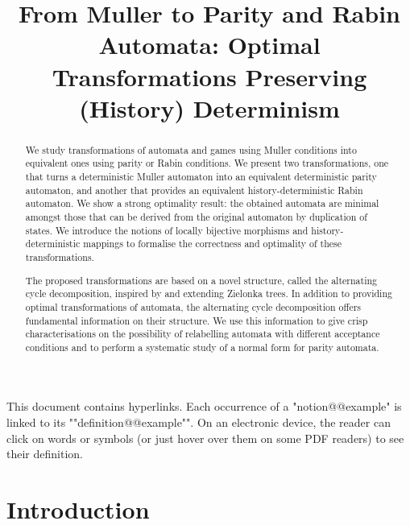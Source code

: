 \documentclass{theoretics}
\title{From Muller to Parity and Rabin Automata: Optimal Transformations Preserving (History) Determinism}
\begin{document}
	\maketitle
	\begin{abstract}
	We study transformations of automata and games using Muller conditions into equivalent ones using parity or Rabin conditions.
	We present two transformations, one that turns a deterministic Muller automaton into an equivalent deterministic parity automaton, and another that provides an equivalent history-deterministic Rabin automaton.
	We show a strong optimality result: the obtained automata are minimal amongst those that can be derived from the original automaton by duplication of states.
	We introduce the notions of locally bijective morphisms and history-deterministic mappings to formalise the correctness and optimality of these transformations.
	
	The proposed transformations are based on a novel structure, called the alternating cycle decomposition, inspired by and extending Zielonka trees. In addition to providing optimal transformations of automata, the alternating cycle decomposition offers fundamental information on their structure. We use this information to give crisp characterisations on the possibility of relabelling automata with different acceptance conditions and to perform a systematic study of a normal form for parity automata.
	\end{abstract}

\paragraph*{}
This document contains hyperlinks.
\AP Each occurrence of a "notion@@example" is linked to its ""definition@@example"".
On an electronic device, the reader can click on words or symbols (or just hover over them on some PDF readers) to see their definition.
		
	
	\section{Introduction}\label{section:introduction}
\end{document}
